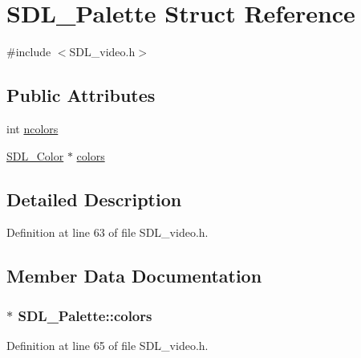 \hypertarget{struct_s_d_l___palette}{}\section{S\+D\+L\+\_\+\+Palette Struct Reference}
\label{struct_s_d_l___palette}


{\ttfamily \#include $<$S\+D\+L\+\_\+video.\+h$>$}

\subsection*{Public Attributes}
\begin{DoxyCompactItemize}
\item 
int \hyperlink{struct_s_d_l___palette_a81a0cc3197480e994c6b06f1f0567091}{ncolors}
\item 
\hyperlink{struct_s_d_l___color}{S\+D\+L\+\_\+\+Color} $\ast$ \hyperlink{struct_s_d_l___palette_ad757a50037f43533196e94942440b241}{colors}
\end{DoxyCompactItemize}


\subsection{Detailed Description}


Definition at line 63 of file S\+D\+L\+\_\+video.\+h.



\subsection{Member Data Documentation}
\hypertarget{struct_s_d_l___palette_ad757a50037f43533196e94942440b241}{}
\subsubsection[{colors}]{$\ast$ S\+D\+L\+\_\+\+Palette\+::colors}\label{struct_s_d_l___palette_ad757a50037f43533196e94942440b241}


Definition at line 65 of file S\+D\+L\+\_\+video.\+h.

\hypertarget{struct_s_d_l___palette_a81a0cc3197480e994c6b06f1f0567091}{}
